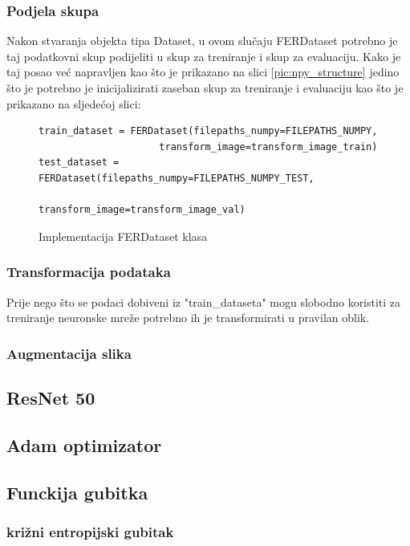 \documentclass[times, utf8, zavrsni,numeric,pstricks]{fer}
\begin{document}
\subsubsection{Podjela skupa}
Nakon stvaranja objekta tipa Dataset, u ovom slučaju FERDataset potrebno je taj podatkovni skup podijeliti u skup za treniranje i skup za evaluaciju. Kako je taj posao već napravljen kao što je prikazano na slici \ref{pic:npy_structure} jedino što je potrebno je inicijalizirati zaseban skup za treniranje i evaluaciju kao što je prikazano na sljedećoj slici:


\begin{figure}[H]
\centering

\begin{Verbatim}[fontsize=\small]
train_dataset = FERDataset(filepaths_numpy=FILEPATHS_NUMPY,
                     transform_image=transform_image_train)
test_dataset = FERDataset(filepaths_numpy=FILEPATHS_NUMPY_TEST,
                          transform_image=transform_image_val)
\end{Verbatim}
\caption{Implementacija FERDataset klasa}
\label{pic:init_dataset}
\end{figure}

\subsubsection{Transformacija podataka}
Prije nego što se podaci dobiveni iz "train_dataseta" mogu slobodno koristiti za treniranje neuronske mreže potrebno ih je transformirati u pravilan oblik. 
\subsubsection{Augmentacija slika}



\subsection{ResNet 50}
\subsection{Adam optimizator}
\subsection{Funckija gubitka}
\subsubsection{križni entropijski gubitak}
\end{document}
